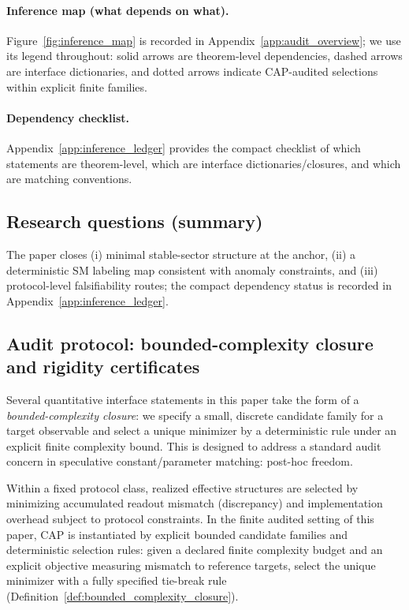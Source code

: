 \paragraph{Inference map (what depends on what).}
Figure~\ref{fig:inference_map} is recorded in Appendix~\ref{app:audit_overview}; we use its legend throughout: solid arrows are theorem-level dependencies, dashed arrows are interface dictionaries, and dotted arrows indicate CAP-audited selections within explicit finite families.

\paragraph{Dependency checklist.}
Appendix~\ref{app:inference_ledger} provides the compact checklist of which statements are \MathTag theorem-level, which are \InterfaceTag interface dictionaries/closures, and which are \MatchTag matching conventions.

\subsection{Research questions (summary)}
\label{subsec:research_questions}
\InterfaceTag The paper closes (i) minimal stable-sector structure at the anchor, (ii) a deterministic SM labeling map consistent with anomaly constraints, and (iii) protocol-level falsifiability routes; the compact dependency status is recorded in Appendix~\ref{app:inference_ledger}.

\subsection{Audit protocol: bounded-complexity closure and rigidity certificates}
\label{subsec:bounded_complexity_audit}

Several quantitative interface statements in this paper take the form of a \emph{bounded-complexity closure}:
we specify a small, discrete candidate family for a target observable and select a unique minimizer by a deterministic rule under an explicit finite complexity bound.
This is designed to address a standard audit concern in speculative constant/parameter matching: post-hoc freedom.

\begin{axiom}\label{ax:cap}
Within a fixed protocol class, realized effective structures are selected by minimizing accumulated readout mismatch (discrepancy) and implementation overhead subject to protocol constraints.
In the finite audited setting of this paper, CAP is instantiated by explicit bounded candidate families and deterministic selection rules: given a declared finite complexity budget and an explicit objective measuring mismatch to reference targets, select the unique minimizer with a fully specified tie-break rule (Definition~\ref{def:bounded_complexity_closure}).
\end{axiom}
